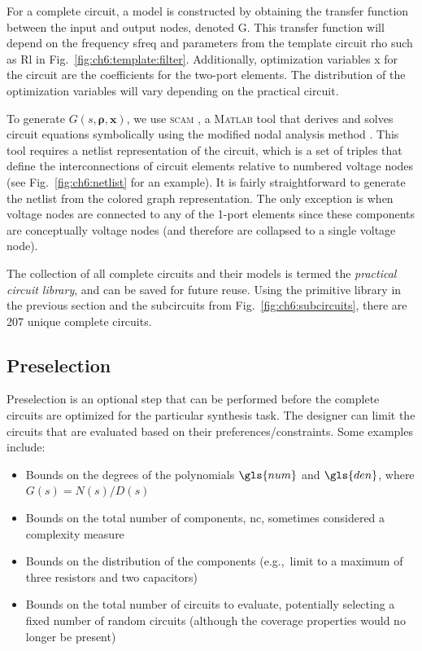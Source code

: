 For a complete circuit, a model is constructed by obtaining the transfer function between the input and output nodes, denoted \gls{G}.
This transfer function will depend on the frequency \gls{sfreq} and parameters from the template circuit \gls{rho} such as \gls{Rl} in Fig.~\ref{fig:ch6:template:filter}.
Additionally, optimization variables \gls{x} for the circuit are the coefficients for the two-port elements.
The distribution of the optimization variables will vary depending on the practical circuit.

To generate $G(s, \bm{\rho}, \bm{x})$, we use \textsc{scam} \cite{scam}, a \textsc{Matlab} tool that derives and solves circuit equations symbolically using the modified nodal analysis method \cite{Ho1975a}.
This tool requires a netlist representation of the circuit, which is a set of triples that define the interconnections of circuit elements relative to numbered voltage nodes (see Fig.~\ref{fig:ch6:netlist} for an example).
It is fairly straightforward to generate the netlist from the colored graph representation.
The only exception is when voltage nodes are connected to any of the 1-port elements since these components are conceptually voltage nodes (and therefore are collapsed to a single voltage node). 

The collection of all complete circuits and their models is termed the \textit{practical circuit library}, and can be saved for future reuse.
Using the primitive library in the previous section and the subcircuits from Fig.~\ref{fig:ch6:subcircuits}, there are 207 unique complete circuits.

\subsection{Preselection}

Preselection is an optional step that can be performed before the complete circuits are optimized for the particular synthesis task.
The designer can limit the circuits that are evaluated based on their preferences/constraints.
Some examples include:
\begin{itemize}
\item Bounds on the degrees of the polynomials $\gls{num}$ and $\gls{den}$, where $G(s) = N(s)/D(s)$

\item Bounds on the total number of components, \gls{nc}, sometimes considered a complexity measure \cite{Goh2001a}

\item Bounds on the distribution of the components (e.g.,~limit to a maximum of three resistors and two capacitors)

\item Bounds on the total number of circuits to evaluate, potentially selecting a fixed number of random circuits (although the coverage properties would no longer be present)

\end{itemize}

